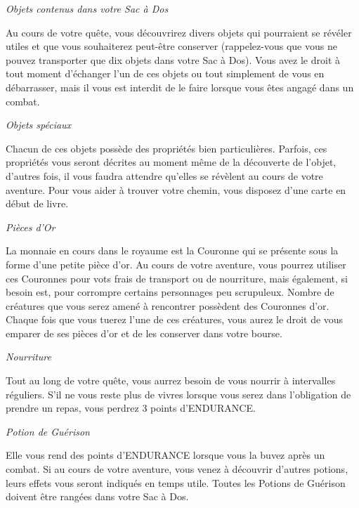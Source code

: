 \documentclass[10pt]{book}
\begin{document}
\begin{center}
  \textit{Objets contenus dans votre Sac à Dos}
\end{center}
Au cours de votre quête, vous découvrirez divers objets qui pourraient se révéler
utiles et que vous souhaiterez peut-être conserver (rappelez-vous que vous ne pouvez
transporter que dix objets dans votre Sac à Dos). Vous avez le droit à tout moment
d'échanger l'un de ces objets ou tout simplement de vous en débarrasser, mais il vous
est interdit de le faire lorsque vous êtes angagé dans un combat.

\begin{center}
  \textit{Objets spéciaux}
\end{center}
Chacun de ces objets possède des propriétés bien particulières. Parfois, ces
propriétés vous seront décrites au moment même de la découverte de l'objet, d'autres
fois, il vous faudra attendre qu'elles se révèlent au cours de votre aventure. Pour
vous aider à trouver votre chemin, vous disposez d'une carte en début de livre.

\begin{center}
  \textit{Pièces d'Or}
\end{center}
La monnaie en cours dans le royaume est la Couronne qui se présente sous la forme
d'une petite pièce d'or. Au cours de votre aventure, vous pourrez utiliser ces
Couronnes pour vots frais de transport ou de nourriture, mais également, si besoin
est, pour corrompre certains personnages peu scrupuleux. Nombre de créatures que vous
serez amené à rencontrer possèdent des Couronnes d'or. Chaque fois que vous tuerez
l'une de ces créatures, vous aurez le droit de vous emparer de ses pièces d'or et de
les conserver dans votre bourse.

\begin{center}
  \textit{Nourriture}
\end{center}
Tout au long de votre quête, vous aurrez besoin de vous nourrir à intervalles
réguliers. S'il ne vous reste plus de vivres lorsque vous serez dans l'obligation
de prendre un repas, vous perdrez 3 points d'ENDURANCE.

\begin{center}
  \textit{Potion de Guérison}
\end{center}
Elle vous rend des points d'ENDURANCE lorsque vous la buvez après un combat.
Si au cours de votre aventure, vous venez à découvrir d'autres potions, leurs
effets vous seront indiqués en temps utile. Toutes les Potions de Guérison
doivent être rangées dans votre Sac à Dos.
\end{document}
